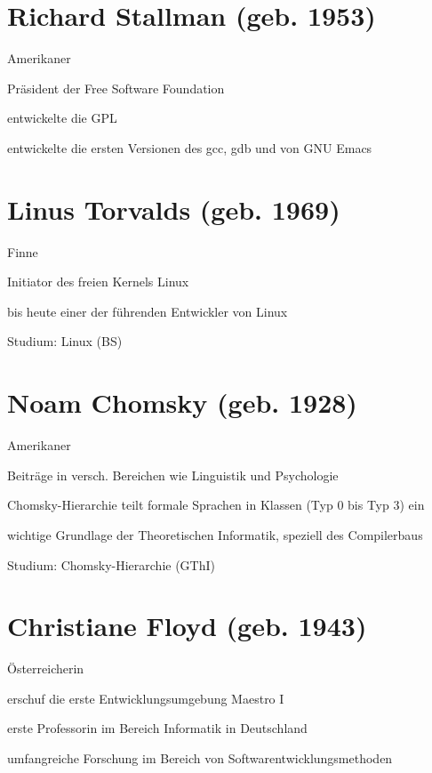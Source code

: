 \documentclass[a4paper,12pt]{report}
\begin{document}
\section{Richard Stallman (geb. 1953)}
\begin{itemize*}
	\item Amerikaner
	\item Präsident der Free Software Foundation
	\item entwickelte die GPL
	\item entwickelte die ersten Versionen des gcc, gdb und von GNU Emacs
\end{itemize*}

\section{Linus Torvalds (geb. 1969)}
\begin{itemize*}
	\item Finne
	\item Initiator des freien Kernels Linux
	\item bis heute einer der führenden Entwickler von Linux
	\item Studium: Linux (BS)
\end{itemize*}

\section{Noam Chomsky (geb. 1928)}
\begin{itemize*}
	\item Amerikaner
	\item Beiträge in versch. Bereichen wie Linguistik und Psychologie
	\item Chomsky-Hierarchie teilt formale Sprachen in Klassen (Typ 0 bis Typ 3) ein
	\item wichtige Grundlage der Theoretischen Informatik, speziell des Compilerbaus
	\item Studium: Chomsky-Hierarchie (GThI)
\end{itemize*}

\section{Christiane Floyd (geb. 1943)}
\begin{itemize*}
	\item Österreicherin
	\item erschuf die erste Entwicklungsumgebung Maestro I
	\item erste Professorin im Bereich Informatik in Deutschland
	\item umfangreiche Forschung im Bereich von Softwarentwicklungsmethoden
\end{itemize*}
\end{document}
